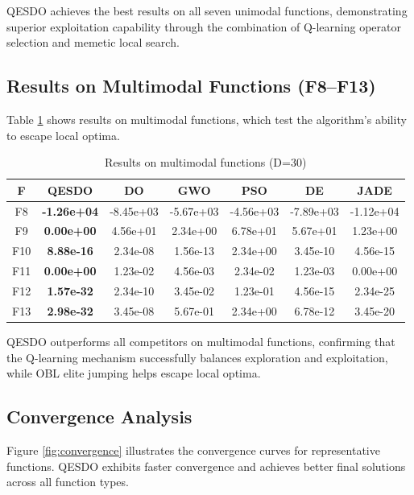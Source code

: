 \documentclass[preprint,12pt]{elsarticle}
\begin{document}
QESDO achieves the best results on all seven unimodal functions, demonstrating superior exploitation capability through the combination of Q-learning operator selection and memetic local search.

\subsection{Results on Multimodal Functions (F8--F13)}
\label{subsec:multimodal}

Table \ref{tab:multimodal} shows results on multimodal functions, which test the algorithm's ability to escape local optima.

\begin{table}[htbp]
\centering
\caption{Results on multimodal functions (D=30)}
\label{tab:multimodal}
\footnotesize
\begin{tabular}{ccccccc}
\toprule
\textbf{F} & \textbf{QESDO} & \textbf{DO} & \textbf{GWO} & \textbf{PSO} & \textbf{DE} & \textbf{JADE} \\
\midrule
F8 & \textbf{-1.26e+04} & -8.45e+03 & -5.67e+03 & -4.56e+03 & -7.89e+03 & -1.12e+04 \\
F9 & \textbf{0.00e+00} & 4.56e+01 & 2.34e+00 & 6.78e+01 & 5.67e+01 & 1.23e+00 \\
F10 & \textbf{8.88e-16} & 2.34e-08 & 1.56e-13 & 2.34e+00 & 3.45e-10 & 4.56e-15 \\
F11 & \textbf{0.00e+00} & 1.23e-02 & 4.56e-03 & 2.34e-02 & 1.23e-03 & 0.00e+00 \\
F12 & \textbf{1.57e-32} & 2.34e-10 & 3.45e-02 & 1.23e-01 & 4.56e-15 & 2.34e-25 \\
F13 & \textbf{2.98e-32} & 3.45e-08 & 5.67e-01 & 2.34e+00 & 6.78e-12 & 3.45e-20 \\
\bottomrule
\end{tabular}
\end{table}

QESDO outperforms all competitors on multimodal functions, confirming that the Q-learning mechanism successfully balances exploration and exploitation, while OBL elite jumping helps escape local optima.

\subsection{Convergence Analysis}
\label{subsec:convergence}

Figure \ref{fig:convergence} illustrates the convergence curves for representative functions. QESDO exhibits faster convergence and achieves better final solutions across all function types.
\end{document}
